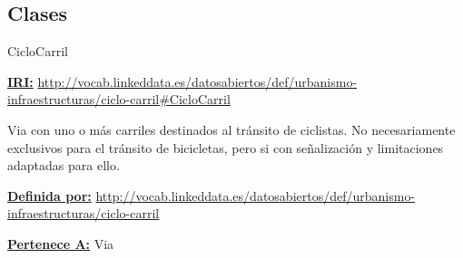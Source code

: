 \subsection{Clases}



\begin{mybox}{CicloCarril}
\begin{flushleft}
\underline{\textbf{IRI:}}
\url{http://vocab.linkeddata.es/datosabiertos/def/urbanismo-infraestructuras/ciclo-carril#CicloCarril}
\newline

Via con uno o más carriles destinados al tránsito de ciclistas. No necesariamente exclusivos para el tránsito de bicicletas, pero si con señalización y limitaciones adaptadas para ello.
\newline

\underline{\textbf{Definida por:}}\newline
\url{http://vocab.linkeddata.es/datosabiertos/def/urbanismo-infraestructuras/ciclo-carril}
\newline

\underline{\textbf{Pertenece A:}}
	Via
\newline

\end{flushleft}
\end{mybox}






